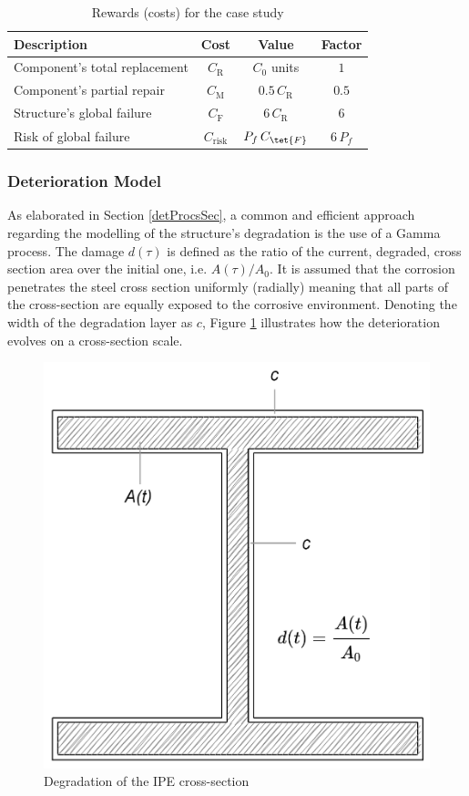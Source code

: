\begin{table}[H]
    \centering
    \caption{Rewards (costs) for the case study}
    \label{costCase}
    \begin{tabular}{lccc}
        \toprule
        \textbf{Description} & \textbf{Cost} & \textbf{Value} & \textbf{Factor} \\ \midrule
        Component's total replacement & $C_{\text{R}}$ & $C_0$ units & $1$ \\ 
        Component's partial repair & $C_{\text{M}}$ & $0.5\, C_{\text{R}}$ & $0.5$ \\
        Structure's global failure & $C_{\text{F}}$ & $6\, C_{\text{R}}$ & $6$ \\ 
        Risk of global failure & $C_{\text{risk}}$ & $P_f\,C_{\tet{F}}$ & $6\,P_f$ \\ \bottomrule
    \end{tabular}
\end{table}




\subsubsection{Deterioration Model}

As elaborated in Section \ref{detProcsSec}, a common and efficient approach regarding the modelling of the structure's degradation is the use of a Gamma process. The damage $d(\tau)$ is defined as the ratio of the current, degraded, cross section area over the initial one, i.e. $A(\tau)/A_0$. It is assumed that the corrosion penetrates the steel cross section uniformly (radially) meaning that all parts of the cross-section are equally exposed to the corrosive environment. Denoting the width of the degradation layer as $c$, Figure \ref{deterCrosSec} illustrates how the deterioration evolves on a cross-section scale.  

\begin{figure}[H]
    \centering
	\includegraphics[width=0.4\linewidth]{Figures/crossSec.png}
	\caption{Degradation of the IPE cross-section}
	\label{deterCrosSec}
\end{figure}

